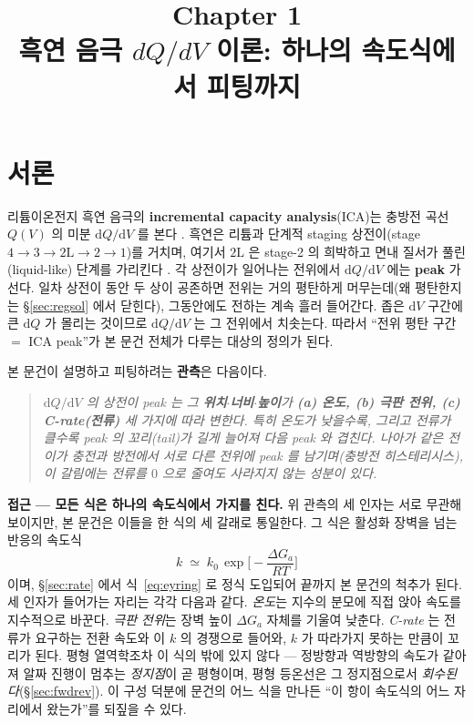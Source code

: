 \documentclass[11pt,a4paper]{article}
\title{\textbf{\LARGE Chapter 1}\\[0.35em]\Large 흑연 음극 $dQ/dV$ 이론: 하나의 속도식에서 피팅까지}
\author{}
\date{}
\newcommand{\dd}{\mathrm{d}}
\begin{document}
\maketitle

\section*{서론}
리튬이온전지 흑연 음극의 \textbf{incremental capacity analysis}(ICA)는 충방전 곡선 $Q(V)$ 의 미분
$\dd Q/\dd V$ 를 본다 \cite{bloom2005,dubarry2012}. 흑연은 리튬과 단계적 staging 상전이(stage
$4\!\to\!3\!\to\!2\mathrm L\!\to\!2\!\to\!1$)를 거치며, 여기서 $2\mathrm L$ 은 stage-2 의 희박하고 면내 질서가 풀린(liquid-like) 단계를
가리킨다 \cite{dahn1991,ohzuku1993,funabiki1999}. 각 상전이가 일어나는 전위에서 $\dd Q/\dd V$ 에는
\textbf{peak} 가 선다. 일차 상전이 동안 두 상이 공존하면 전위는 거의 평탄하게 머무는데(왜 평탄한지는 \S\ref{sec:regsol}
에서 닫힌다), 그동안에도 전하는 계속 흘러 들어간다. 좁은 $\dd V$ 구간에 큰 $\dd Q$ 가 몰리는
것이므로 $\dd Q/\dd V$ 는 그 전위에서 치솟는다.
따라서 ``전위 평탄 구간 $=$ ICA peak''가 본 문건 전체가 다루는 대상의 정의가 된다.

본 문건이 설명하고 피팅하려는 \textbf{관측}은 다음이다.
\begin{quote}\itshape
$\dd Q/\dd V$ 의 상전이 peak 는 그 \textbf{위치$\cdot$너비$\cdot$높이}가 \textbf{(a) 온도, (b) 극판
전위, (c) C-rate(전류)} 세 가지에 따라 변한다. 특히 온도가 낮을수록, 그리고 전류가 클수록 peak 의 꼬리(tail)가 길게
늘어져 다음 peak 와 겹친다. 나아가 같은 전이가 충전과 방전에서 서로 다른 전위에 peak 를 남기며(충방전
히스테리시스), 이 갈림에는 전류를 $0$ 으로 줄여도 사라지지 않는 성분이 있다.
\end{quote}

\textbf{접근 — 모든 식은 하나의 속도식에서 가지를 친다.} 위 관측의 세 인자는 서로 무관해 보이지만, 본 문건은
이들을 한 식의 세 갈래로 통일한다. 그 식은 활성화 장벽을 넘는 반응의 속도식
\begin{equation*}
k\;\simeq\;k_0\,\exp\!\Big[-\frac{\Delta G_a}{RT}\Big]
\end{equation*}
이며, \S\ref{sec:rate} 에서 식~\eqref{eq:eyring} 로 정식 도입되어 끝까지 본 문건의 척추가 된다. 세 인자가
들어가는 자리는 각각 다음과 같다. \emph{온도}는 지수의 분모에 직접 앉아 속도를 지수적으로 바꾼다.
\emph{극판 전위}는 장벽 높이 $\Delta G_a$ 자체를 기울여 낮춘다. \emph{C-rate} 는 전류가 요구하는 전환
속도와 이 $k$ 의 경쟁으로 들어와, $k$ 가 따라가지 못하는 만큼이 꼬리가 된다. 평형 열역학조차 이 식의 밖에
있지 않다 — 정방향과 역방향의 속도가 같아져 알짜 진행이 멈추는 \emph{정지점}이 곧 평형이며, 평형 등온선은 그
정지점으로서 \emph{회수된다}(\S\ref{sec:fwdrev}). 이 구성 덕분에 문건의 어느 식을 만나든 ``이 항이
속도식의 어느 자리에서 왔는가''를 되짚을 수 있다.
\end{document}
